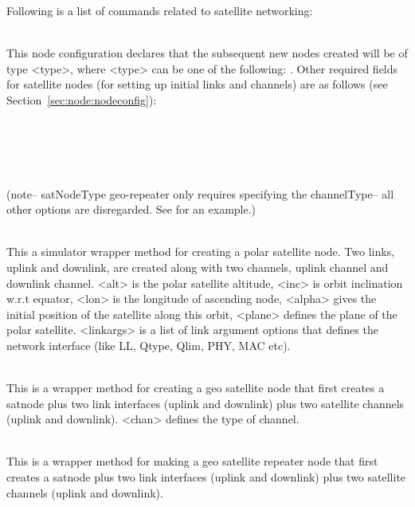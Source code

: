 Following is a list of commands related to satellite networking:
\begin{flushleft}
\\
This node configuration declares that the subsequent new nodes created
will be of type <type>, where <type> can be one of the following:
.  Other required fields for
satellite nodes (for setting up initial links and channels) are as follows 
(see Section~\ref{sec:node:nodeconfig}):
\\
\\
\\
\\
\\
\\

(note-- satNodeType geo-repeater only requires specifying the channelType-- all other options are disregarded.  See  for an example.)

\\
This a simulator wrapper method for creating a polar satellite node. Two
links, uplink and downlink, are created along with two channels, uplink
channel and downlink channel. <alt> is the polar satellite altitude,
<inc> is orbit inclination w.r.t equator, <lon> is the longitude of 
ascending node, <alpha>
gives the initial position of the satellite along this orbit, <plane> 
defines the plane of
the polar satellite. <linkargs> is a list of link argument options that
defines the network interface (like LL, Qtype, Qlim, PHY, MAC etc).


\\
This is a wrapper method for creating a geo satellite node that first
creates a satnode plus two link interfaces (uplink and downlink) plus two 
satellite channels (uplink and downlink). <chan> defines the type of
channel.


\\
This is a wrapper method for making a geo satellite repeater node that 
first creates a satnode plus two link interfaces (uplink and downlink)
plus two satellite channels (uplink and downlink). 



\end{flushleft}
